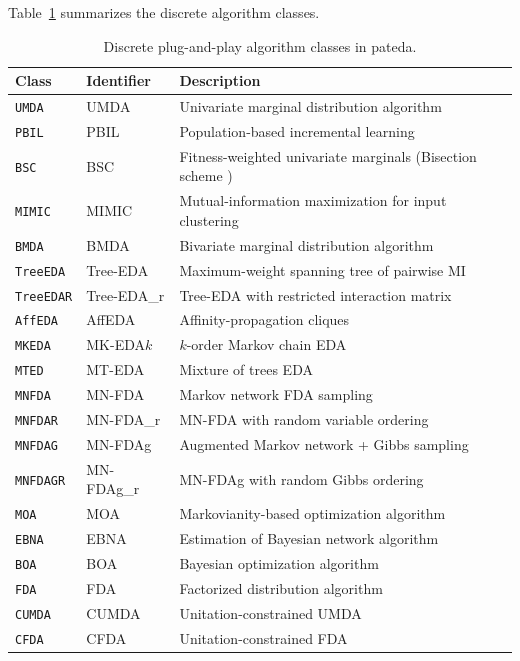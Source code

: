 \documentclass[a4paper,11pt]{article}
\begin{document}
\vspace{0.5em}

Table~\ref{tab:discrete_algs} summarizes the discrete algorithm classes.

\begin{table}[ht]
\centering
\small
\setlength{\tabcolsep}{4pt}
\begin{tabular}{llp{6.5cm}}
\toprule
\textbf{Class} & \textbf{Identifier} & \textbf{Description} \\
\midrule
\texttt{UMDA} & UMDA & Univariate marginal distribution algorithm
  \citep{Muhlenbein_and_Paas:1996} \\
\texttt{PBIL} & PBIL & Population-based incremental learning \citep{Baluja:1994} \\
\texttt{BSC}  & BSC  & Fitness-weighted univariate marginals (Bisection scheme \citep{Inza_et_al:2000}) \\
\texttt{MIMIC} & MIMIC & Mutual-information maximization for input clustering \citep{DeBonet_et_al:1996} \\
\texttt{BMDA} & BMDA & Bivariate marginal distribution algorithm \\
\texttt{TreeEDA} & Tree-EDA & Maximum-weight spanning tree of pairwise MI \citep{Baluja_and_Davies:1997,Pelikan_and_Muhlenbein:1999} \\
\texttt{TreeEDAR} & Tree-EDA\_r & Tree-EDA with restricted interaction matrix \\
\texttt{AffEDA} & AffEDA & Affinity-propagation cliques \citep{Frey_and_Dueck:2007,Santana_et_al:2008} \\
\texttt{MKEDA} & MK-EDA$k$ & $k$-order Markov chain EDA \citep{Santana_et_al:2004} \\
\texttt{MTED} & MT-EDA & Mixture of trees EDA \citep{Santana_et_al:2001br} \\
\texttt{MNFDA} & MN-FDA & Markov network FDA sampling \citep{Santana:2005} \\
\texttt{MNFDAR} & MN-FDA\_r & MN-FDA with random variable ordering \\
\texttt{MNFDAG} & MN-FDAg & Augmented Markov network + Gibbs sampling \\
\texttt{MNFDAGR} & MN-FDAg\_r & MN-FDAg with random Gibbs ordering \\
\texttt{MOA}  & MOA & Markovianity-based optimization algorithm \citep{Shakya_and_McCall:2007,Shakya_and_Santana:2008} \\
\texttt{EBNA} & EBNA & Estimation of Bayesian network algorithm \citep{Etxeberria_and_Larranhaga:1999} \\
\texttt{BOA}  & BOA & Bayesian optimization algorithm \citep{Pelikan_et_al:1999,Pelikan:2005} \\
\texttt{FDA}  & FDA & Factorized distribution algorithm \citep{Muhlenbein_et_al:1999} \\
\texttt{CUMDA} & CUMDA & Unitation-constrained UMDA \\
\texttt{CFDA} & CFDA & Unitation-constrained FDA \\
\bottomrule
\end{tabular}
\caption{Discrete plug-and-play algorithm classes in pateda.}
\label{tab:discrete_algs}
\end{table}
\end{document}
